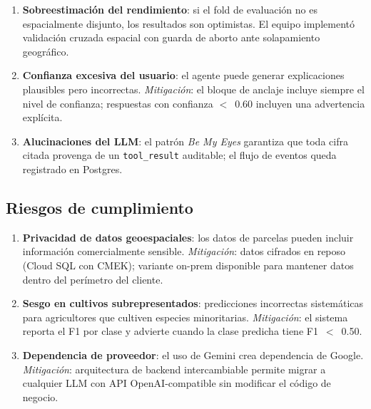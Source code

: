 \documentclass{article}
\begin{document}
\begin{enumerate}[leftmargin=*]
    \item \textbf{Sobreestimación del rendimiento}: si el fold de evaluación
    no es espacialmente disjunto, los resultados son optimistas. El equipo
    implementó validación cruzada espacial con guarda de aborto ante
    solapamiento geográfico.

    \item \textbf{Confianza excesiva del usuario}: el agente puede generar
    explicaciones plausibles pero incorrectas. \textit{Mitigación}: el
    bloque de anclaje incluye siempre el nivel de confianza; respuestas con
    confianza $<$~0.60 incluyen una advertencia explícita.

    \item \textbf{Alucinaciones del LLM}: el patrón \textit{Be My Eyes}
    garantiza que toda cifra citada provenga de un \texttt{tool\_result}
    auditable; el flujo de eventos queda registrado en Postgres.
\end{enumerate}

\subsection{Riesgos de cumplimiento}

\begin{enumerate}[leftmargin=*]
    \item \textbf{Privacidad de datos geoespaciales}: los datos de parcelas
    pueden incluir información comercialmente sensible.
    \textit{Mitigación}: datos cifrados en reposo (Cloud SQL con CMEK);
    variante on-prem disponible para mantener datos dentro del perímetro
    del cliente.

    \item \textbf{Sesgo en cultivos subrepresentados}: predicciones
    incorrectas sistemáticas para agricultores que cultiven especies
    minoritarias. \textit{Mitigación}: el sistema reporta el F1 por clase
    y advierte cuando la clase predicha tiene F1~$<$~0.50.

    \item \textbf{Dependencia de proveedor}: el uso de Gemini crea
    dependencia de Google. \textit{Mitigación}: arquitectura de backend
    intercambiable permite migrar a cualquier LLM con API OpenAI-compatible
    sin modificar el código de negocio.
\end{enumerate}

\end{document}
